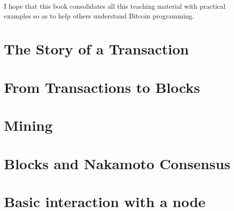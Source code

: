 I hope that this book consolidates all this teaching material with practical examples so as to help others understand Bitcoin programming.

\section{The Story of a Transaction}
\section{From Transactions to Blocks}
\section{Mining}
\section{Blocks and Nakamoto Consensus}
\section{Basic interaction with a node}


